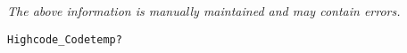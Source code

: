 \label{pkg:highcode\_codetemp}

{\tiny \it The above information is manually maintained and may contain errors.}
\begin{verbatim}
Highcode_Codetemp?
\end{verbatim}
